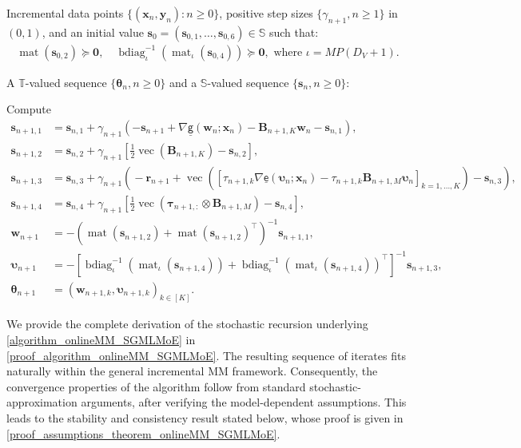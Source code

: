 \documentclass{article}
\newcommand{\mdm}{softmax-gated multinomial logistic MoE }
\newcommand{\zero}{\ensuremath{\mathbf{0}}}
\DeclareMathOperator*{\vect}{vec} %
\DeclareMathOperator*{\mat}{mat}
\DeclareMathOperator{\bdiag}{bdiag}
\def\param{\vtheta}
\def\sfg{\mathsf{g}}
\def\ex{\mathsf{e}}
\newcommand{\ooint}[1]{\left(#1\right)}%
\def\vtau{{\bm{\tau}}}
\def\vupsilon{{\bm{\upsilon}}}
\def\vtheta{{\bm{\theta}}}
\def\vr{{\bm{r}}}
\def\vs{{\bm{s}}}
\def\vw{{\bm{w}}}
\def\vx{{\bm{x}}}
\def\vy{{\bm{y}}}
\def\mB{{\bm{B}}}
\def\sS{{\mathbb{S}}}
\def\sT{{\mathbb{T}}}
\begin{document}
\begin{algorithm}[H]
\caption{Incremental MM algorithm for \mdm models}
\label{algorithm_onlineMM_SGMLMoE}
\begin{algorithmic}[1]
    \Require Incremental data points $\{(\vx_{n},\vy_{n}):n \ge 0\}$, positive step sizes $\{\gamma_{n+1}, n \geq 1 \}$ in  $\ooint{0,1}$, and an initial value $\vs_0 = (\vs_{0,1},\ldots,\vs_{0,6}) \in \sS$ such that:
    \begin{align*}
        \mat(\vs_{0,2})\succeq \zero, \quad {\bdiag}_{\iota}^{-1}({\mat}_{\iota}(\vs_{0,4}))\succeq \zero, \text{ where } \iota = MP(D_V+1). 
    \end{align*}
    
    \Ensure A $\sT$-valued sequence $\{\param_n, n \ge 0\}$ and a $\sS$-valued sequence $\{\vs_n, n \ge 0\}$:

        \State Compute
            \begin{align*}
            \vs_{n+1,1}&=\vs_{n,1}+\gamma_{n+1}\left(-\vs_{n+1}+\nabla \underline{\sfg}(\vw_{n};\vx_n)-\mB_{n+1,K}\vw_{n}-\vs_{n,1}\right),\\
            \vs_{n+1,2}&=\vs_{n,2}+\gamma_{n+1}\left[\frac{1}{2}\vect\left(\mB_{n+1,K}\right)-\vs_{n,2}\right],\\
            \vs_{n+1,3}&=\vs_{n,3}\!+\!\gamma_{n+1}\!\left(\!-\vr_{n+1}\!+\!\vect\!\left(\![\tau_{n+1,k}\!\nabla \!\underline{\ex}(\!\vupsilon_{n};\vx_n\!)-\!\tau_{n+1,k}\!\mB_{\!n+1,M}\vupsilon_{n}\!]_{k=1,\dots,K}\!\right)\!-\!\vs_{n,3}\!\right)\!,\\
            \vs_{n+1,4}&=\vs_{n,4}+\gamma_{n+1}\left[\frac{1}{2}\vect\left(\vtau_{n+1,:}\otimes\mB_{n+1,M}\right)-\vs_{n,4}\right],\\
        \vw_{n+1}& = -\left(\mat(\vs_{n+1,2}) + \mat(\vs_{n+1,2})^{\top}\right)^{-1} \vs_{n+1,1},\\
        \vupsilon_{n+1} &= -\left[{\bdiag}_{\iota}^{-1}({\mat}_{\iota}(\vs_{n+1,4}))+{\bdiag}_{\iota}^{-1}({\mat}_{\iota}(\vs_{n+1,4}))^{\top}\right]^{-1} \vs_{n+1,3},\\
         \vtheta_{n+1} &= \left(\vw_{n+1,k},\vupsilon_{n+1,k}\right)_{k\in[K]}.
        \end{align*}
    \EndFor
\end{algorithmic}
\end{algorithm}

We provide the complete derivation of the stochastic recursion underlying
\cref{algorithm_onlineMM_SGMLMoE} in \cref{proof_algorithm_onlineMM_SGMLMoE}.
The resulting sequence of iterates fits naturally within the general
incremental MM framework.
Consequently, the convergence properties of the algorithm follow from
standard stochastic-approximation arguments, after verifying the
model-dependent assumptions.
This leads to the stability and consistency result stated below, whose proof
is given in \cref{proof_assumptions_theorem_onlineMM_SGMLMoE}.
\end{document}
